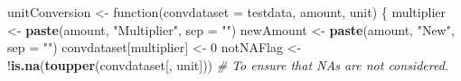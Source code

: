 \documentclass[]{article}
\newenvironment{Shaded}{\begin{snugshade}}{\end{snugshade}}
\newcommand{\KeywordTok}[1]{\textcolor[rgb]{0.13,0.29,0.53}{\textbf{{#1}}}}
\newcommand{\DataTypeTok}[1]{\textcolor[rgb]{0.13,0.29,0.53}{{#1}}}
\newcommand{\DecValTok}[1]{\textcolor[rgb]{0.00,0.00,0.81}{{#1}}}
\newcommand{\StringTok}[1]{\textcolor[rgb]{0.31,0.60,0.02}{{#1}}}
\newcommand{\CommentTok}[1]{\textcolor[rgb]{0.56,0.35,0.01}{\textit{{#1}}}}
\newcommand{\NormalTok}[1]{{#1}}
\begin{document}
\begin{Shaded}
\begin{Highlighting}[]
\NormalTok{unitConversion <-}\StringTok{ }\NormalTok{function(}\DataTypeTok{convdataset =} \NormalTok{testdata, amount, unit) \{}
     \NormalTok{multiplier <-}\StringTok{ }\KeywordTok{paste}\NormalTok{(amount, }\StringTok{"Multiplier"}\NormalTok{, }\DataTypeTok{sep =} \StringTok{""}\NormalTok{)}
     \NormalTok{newAmount <-}\StringTok{ }\KeywordTok{paste}\NormalTok{(amount, }\StringTok{"New"}\NormalTok{, }\DataTypeTok{sep =} \StringTok{""}\NormalTok{)}
     \NormalTok{convdataset[multiplier] <-}\StringTok{ }\DecValTok{0}
     \NormalTok{notNAFlag <-}\StringTok{ }\NormalTok{!}\KeywordTok{is.na}\NormalTok{(}\KeywordTok{toupper}\NormalTok{(convdataset[, unit])) }\CommentTok{# To ensure that NAs are not considered.}
     

\end{Highlighting}
\end{Shaded}
\end{document}
